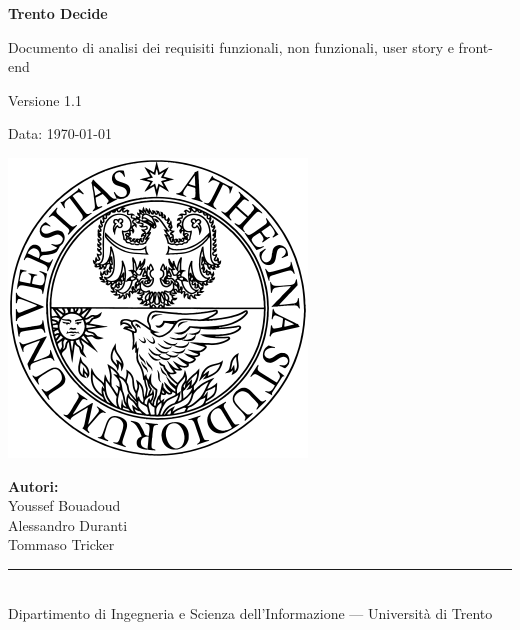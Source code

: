 \documentclass[a4paper]{report}
\begin{document}
\begin{titlepage}
  \centering

  {\Huge \bfseries Trento Decide \par}
  \vspace{1cm}

  {\Large Documento di analisi dei requisiti funzionali, non funzionali, user story e front-end \par}
  \vspace{1.5cm}

  {\large Versione 1.1 \par}
  \vspace{0.5cm}

  {\large Data: \today \par}
  \vspace{3.5cm}

  \includegraphics[width=0.25 \textwidth]{img/unitn.png}

  \vfill

  \begin{flushright}
    \textbf{Autori:}\\[0.3em]
    Youssef Bouadoud\\
    Alessandro Duranti\\
    Tommaso Tricker
  \end{flushright}
  \vspace{1cm}
  
  \rule{\textwidth}{0.4pt}\\[0.3em]
  {\small Dipartimento di Ingegneria e Scienza dell'Informazione — Università di Trento}
\end{titlepage}

\tableofcontents
\newpage





\end{document}
